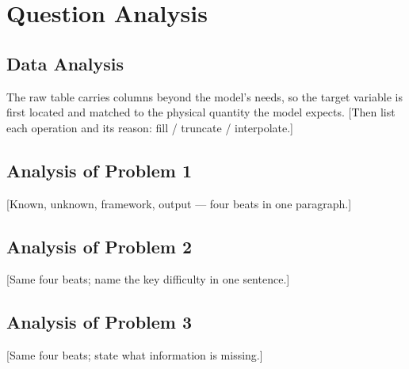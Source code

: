 \section{Question Analysis}

\subsection{Data Analysis}
The raw table carries columns beyond the model's needs, so the target variable is first
located and matched to the physical quantity the model expects. [Then list each
operation and its reason: fill / truncate / interpolate.]

\subsection{Analysis of Problem 1}
[Known, unknown, framework, output — four beats in one paragraph.]

\subsection{Analysis of Problem 2}
[Same four beats; name the key difficulty in one sentence.]

\subsection{Analysis of Problem 3}
[Same four beats; state what information is missing.]

